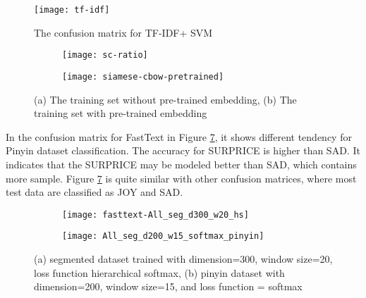 \begin{figure}[h]
    \centering
	\texttt{[image: tf-idf]}
    \caption{The confusion matrix for TF-IDF+ SVM}
    \label{confusion1}
\end{figure}

\begin{figure}
\centering
\begin{subfigure}[b]{1\textwidth}
   \texttt{[image: sc-ratio]}
   \caption{}
   \label{confusion2} 
\end{subfigure}

\begin{subfigure}[b]{1\textwidth}
   \texttt{[image: siamese-cbow-pretrained]}
   \caption{}
   \label{confusion5}
\end{subfigure}
\caption[Confusion Matrix of Siamese-CBOW]{(a) The training set without pre-trained embedding,
(b) The training set with pre-trained embedding
}
\end{figure}


In the confusion matrix for FastText in Figure \ref{confusion4}, it shows different tendency for Pinyin dataset classification. 
The accuracy for SURPRICE is higher than SAD. It indicates that the SURPRICE may be modeled better than SAD, which contains more sample.
Figure \ref{confusion4} is quite similar with other confusion matrices, where most test data are classified as JOY and SAD.

\begin{figure}
\centering
\begin{subfigure}[b]{1\textwidth}
   \texttt{[image: fasttext-All\_seg\_d300\_w20\_hs]}
   \caption{}
   \label{confusion3} 
\end{subfigure}

\begin{subfigure}[b]{1\textwidth}
   \texttt{[image: All\_seg\_d200\_w15\_softmax\_pinyin]}
   \caption{}
   \label{confusion4}
\end{subfigure}
\caption[Confusion matrix of FastText]{(a) segmented dataset trained with dimension=300, window size=20, loss function hierarchical softmax,
(b) pinyin dataset with dimension=200, window size=15, and loss function = softmax
}
\end{figure}
